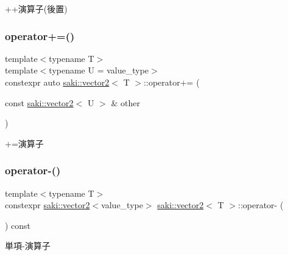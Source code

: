 ++演算子(後置) 

\mbox{\label{classsaki_1_1vector2_a7d05381a39a16fd2b8a5bf48756101f3}} 
\subsubsection{\texorpdfstring{operator+=()}{operator+=()}}
{\footnotesize\ttfamily template$<$typename T$>$ \\
template$<$typename U  = value\+\_\+type$>$ \\
constexpr auto \mbox{\hyperlink{classsaki_1_1vector2}{saki\+::vector2}}$<$ T $>$\+::operator+= (\begin{DoxyParamCaption}\item[{const \mbox{\hyperlink{classsaki_1_1vector2}{saki\+::vector2}}$<$ U $>$ \&}]{other }\end{DoxyParamCaption})\hspace{0.3cm}{\ttfamily [inline]}}



+=演算子 

\mbox{\label{classsaki_1_1vector2_a92def26a2ee843e86295ba3bf5d56d31}} 
\subsubsection{\texorpdfstring{operator-\/()}{operator-()}}
{\footnotesize\ttfamily template$<$typename T$>$ \\
constexpr \mbox{\hyperlink{classsaki_1_1vector2}{saki\+::vector2}}$<$value\+\_\+type$>$ \mbox{\hyperlink{classsaki_1_1vector2}{saki\+::vector2}}$<$ T $>$\+::operator-\/ (\begin{DoxyParamCaption}{ }\end{DoxyParamCaption}) const\hspace{0.3cm}{\ttfamily [inline]}}



単項-\/演算子 

\mbox{\label{classsaki_1_1vector2_a89080c4aa884a4724db9a1a9928cf874}} 
